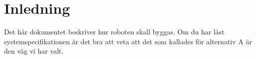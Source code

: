 \section{Inledning}
Det här dokumentet beskriver hur roboten skall byggas. Om du har läst
systemspecifikationen är det bra att veta att det som kallades för alternativ A
är den väg vi har valt.
